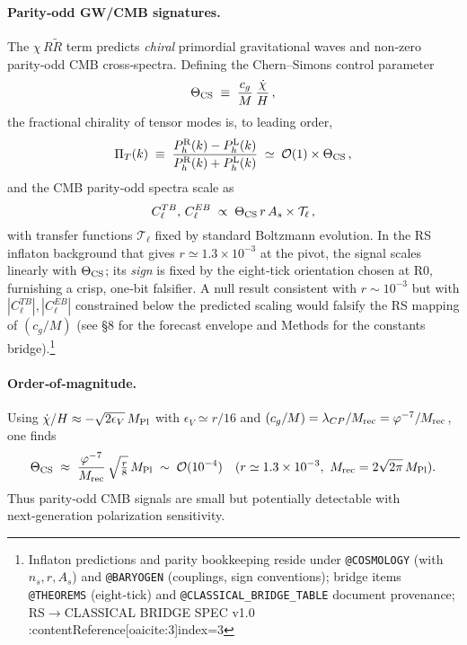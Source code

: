 \documentclass[11pt]{article}
\begin{document}
\paragraph{Parity‑odd GW/CMB signatures.}
The \(\chi\,R\tilde R\) term predicts \emph{chiral} primordial gravitational waves and non‑zero parity‑odd CMB cross‑spectra. Defining the Chern–Simons control parameter
\begin{equation}
  \Theta_{\rm CS} \;\equiv\; \frac{c_g}{M}\,\frac{\dot\chi}{H}\,,
\end{equation}
the fractional chirality of tensor modes is, to leading order,
\begin{equation}
  \Pi_T(k) \;\equiv\; \frac{P_h^{\rm R}(k)-P_h^{\rm L}(k)}{P_h^{\rm R}(k)+P_h^{\rm L}(k)}
  \;\simeq\; \mathcal{O}(1)\times \Theta_{\rm CS}\,,
\end{equation}
and the CMB parity‑odd spectra scale as
\begin{equation}
  C_\ell^{TB},\, C_\ell^{EB} \;\propto\; \Theta_{\rm CS}\, r\, A_s \times \mathcal{T}_\ell\,,
\end{equation}
with transfer functions \(\mathcal{T}_\ell\) fixed by standard Boltzmann evolution. In the RS inflaton background that gives \(r\simeq 1.3\times 10^{-3}\) at the pivot, the signal scales linearly with \(\Theta_{\rm CS}\); its \emph{sign} is fixed by the eight‑tick orientation chosen at R0, furnishing a crisp, one‑bit falsifier. A null result consistent with \(r\sim 10^{-3}\) but with \(|C_\ell^{TB}|,|C_\ell^{EB}|\) constrained below the predicted scaling would falsify the RS mapping of \((c_g/M)\) (see §8 for the forecast envelope and Methods for the constants bridge).\footnote{Inflaton predictions and parity bookkeeping reside under \texttt{@COSMOLOGY} (with \(n_s, r, A_s\)) and \texttt{@BARYOGEN} (couplings, sign conventions); bridge items \texttt{@THEOREMS} (eight‑tick) and \texttt{@CLASSICAL\_BRIDGE\_TABLE} document provenance; RS\(\to\)CLASSICAL BRIDGE SPEC v1.0 :contentReference[oaicite:3]{index=3}}

\paragraph{Order‑of‑magnitude.}
Using \(\dot\chi/H\approx -\sqrt{2\epsilon_V}\,M_{\rm Pl}\) with \(\epsilon_V\simeq r/16\) and \((c_g/M)=\lambda_{CP}/M_{\rm rec}=\varphi^{-7}/M_{\rm rec}\), one finds
\[
  \Theta_{\rm CS} \;\approx\; \frac{\varphi^{-7}}{M_{\rm rec}}\,\sqrt{\tfrac{r}{8}}\,M_{\rm Pl}
  \;\sim\; \mathcal{O}(10^{-4})\quad (r\simeq 1.3\times10^{-3},\ M_{\rm rec}=2\sqrt{2\pi}\,M_{\rm Pl}).
\]
Thus parity‑odd CMB signals are small but potentially detectable with next‑generation polarization sensitivity.
\end{document}
